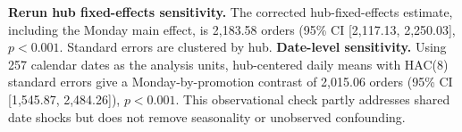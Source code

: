 \textbf{Rerun hub fixed-effects sensitivity.} The corrected hub-fixed-effects estimate, including the Monday main effect, is 2,183.58 orders (95\% CI [2,117.13, 2,250.03], $p<0.001$. Standard errors are clustered by hub. \textbf{Date-level sensitivity.} Using 257 calendar dates as the analysis units, hub-centered daily means with HAC(8) standard errors give a Monday-by-promotion contrast of 2,015.06 orders (95\% CI [1,545.87, 2,484.26]), $p<0.001$. This observational check partly addresses shared date shocks but does not remove seasonality or unobserved confounding.
